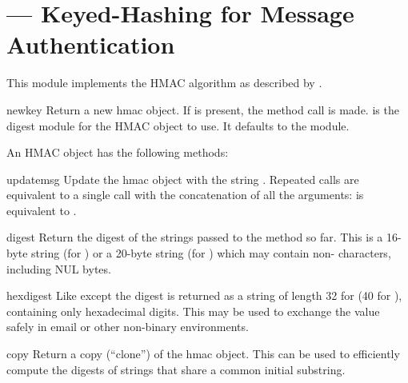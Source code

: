 \section{ ---
         Keyed-Hashing for Message Authentication}



This module implements the HMAC algorithm as described by .

\begin{funcdesc}{new}{key}
  Return a new hmac object.  If  is present, the method call
   is made.  is the digest
  module for the HMAC object to use. It defaults to the
   module.
\end{funcdesc}

An HMAC object has the following methods:

\begin{methoddesc}[hmac]{update}{msg}
  Update the hmac object with the string .  Repeated calls
  are equivalent to a single call with the concatenation of all the
  arguments:  is equivalent to
  .
\end{methoddesc}

\begin{methoddesc}[hmac]{digest}{}
  Return the digest of the strings passed to the 
  method so far.  This is a 16-byte string (for ) or a
  20-byte string (for ) which may contain non-\ASCII{}
  characters, including NUL bytes.
\end{methoddesc}

\begin{methoddesc}[hmac]{hexdigest}{}
  Like  except the digest is returned as a string of
  length 32 for  (40 for ), containing
  only hexadecimal digits.  This may be used to exchange the value
  safely in email or other non-binary environments.
\end{methoddesc}

\begin{methoddesc}[hmac]{copy}{}
  Return a copy (``clone'') of the hmac object.  This can be used to
  efficiently compute the digests of strings that share a common
  initial substring.
\end{methoddesc}
